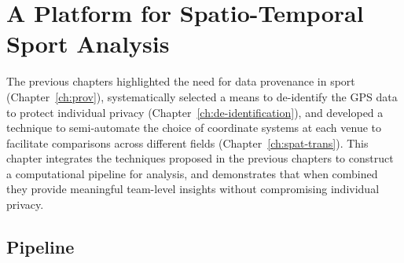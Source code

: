 
\newcommand{\notationdetails}{(see \chref{ch:prov} for semantics of notation and \appendixsecref{appendixsec:SportSymbols} for symbols)}

\chapter{A Platform for Spatio-Temporal Sport Analysis}
\label{ch:integration}
\startchapternobreak




The previous chapters highlighted the need for data provenance in sport (Chapter~\ref{ch:prov}), systematically selected a means to de-identify the GPS data to protect individual privacy (Chapter~\ref{ch:de-identification}), and developed a technique to semi-automate the choice of coordinate systems at each venue to facilitate comparisons across different fields (Chapter~\ref{ch:spat-trans}). This chapter integrates the techniques proposed in the previous chapters to construct a computational pipeline for \afl{} analysis, and demonstrates that when combined they provide meaningful team-level insights without compromising individual privacy.


\section{Pipeline}


